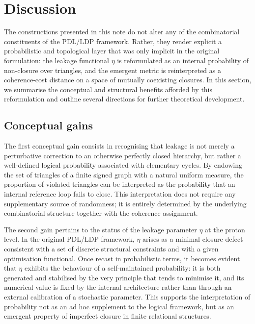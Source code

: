 \documentclass[11pt,a4paper]{article}
\theoremstyle{definition}
\newcommand{\etaL}{\eta} %
\begin{document}
\section{Discussion}

The constructions presented in this note do not alter any of the combinatorial constituents of the PDL/LDP framework. Rather, they render explicit a probabilistic and topological layer that was only implicit in the original formulation: the leakage functional \(\eta\) is reformulated as an internal probability of non-closure over triangles, and the emergent metric is reinterpreted as a coherence-cost distance on a space of mutually coexisting closures. In this section, we summarise the conceptual and structural benefits afforded by this reformulation and outline several directions for further theoretical development.

\subsection{Conceptual gains}

The first conceptual gain consists in recognising that leakage is not merely a perturbative correction to an otherwise perfectly closed hierarchy, but rather a well-defined logical probability associated with elementary cycles. By endowing the set of triangles of a finite signed graph with a natural uniform measure, the proportion of violated triangles can be interpreted as the probability that an internal reference loop fails to close. This interpretation does not require any supplementary source of randomness; it is entirely determined by the underlying combinatorial structure together with the coherence assignment.

The second gain pertains to the status of the leakage parameter \(\etaL\) at the proton level. In the original PDL/LDP framework, \(\etaL\) arises as a minimal closure defect consistent with a set of discrete structural constraints and with a given optimisation functional. Once recast in probabilistic terms, it becomes evident that \(\etaL\) exhibits the behaviour of a self-maintained probability: it is both generated and stabilised by the very principle that tends to minimise it, and its numerical value is fixed by the internal architecture rather than through an external calibration of a stochastic parameter. This supports the interpretation of probability not as an ad hoc supplement to the logical framework, but as an emergent property of imperfect closure in finite relational structures.
\end{document}
